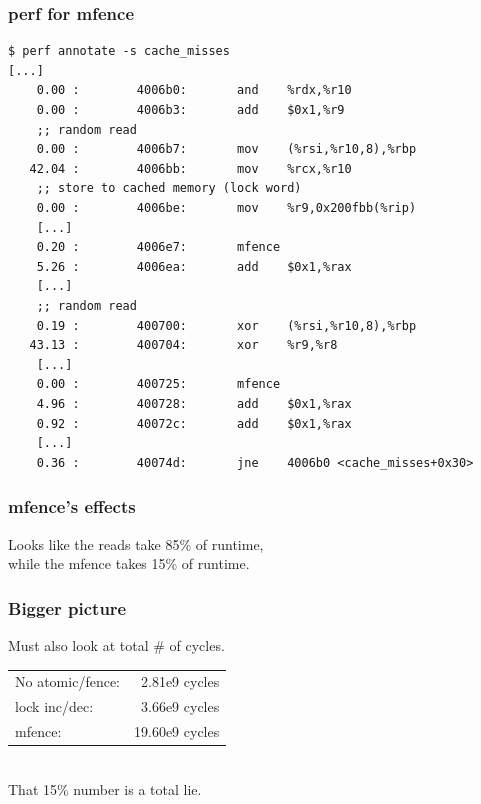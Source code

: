 \documentclass[aspectratio=43]{beamer}
\newenvironment{changemargin}[1]{%
  \begin{list}{}{%
    \setlength{\topsep}{0pt}%
    \setlength{\leftmargin}{#1}%
    \setlength{\rightmargin}{1em}
    \setlength{\listparindent}{\parindent}%
    \setlength{\itemindent}{\parindent}%
    \setlength{\parsep}{\parskip}%
  }%
  \item[]}{\end{list}}
\begin{document}
\begin{frame}[fragile]
  \frametitle{perf for mfence}

  \begin{lstlisting}
$ perf annotate -s cache_misses
[...]
    0.00 :        4006b0:       and    %rdx,%r10
    0.00 :        4006b3:       add    $0x1,%r9
    ;; random read
    0.00 :        4006b7:       mov    (%rsi,%r10,8),%rbp
   42.04 :        4006bb:       mov    %rcx,%r10
    ;; store to cached memory (lock word)
    0.00 :        4006be:       mov    %r9,0x200fbb(%rip)
    [...]
    0.20 :        4006e7:       mfence 
    5.26 :        4006ea:       add    $0x1,%rax
    [...]
    ;; random read
    0.19 :        400700:       xor    (%rsi,%r10,8),%rbp
   43.13 :        400704:       xor    %r9,%r8
    [...]
    0.00 :        400725:       mfence 
    4.96 :        400728:       add    $0x1,%rax
    0.92 :        40072c:       add    $0x1,%rax
    [...]
    0.36 :        40074d:       jne    4006b0 <cache_misses+0x30>
  \end{lstlisting}

\end{frame}

\begin{frame}
  \frametitle{mfence's effects}

  \begin{changemargin}{2cm}
    Looks like the reads take 85\% of runtime,\\
    while the mfence takes 15\% of runtime.
  \end{changemargin}

\end{frame}

\begin{frame}
  \frametitle{Bigger picture}

  \begin{changemargin}{2cm}
    Must also look at total \# of cycles.\\[1em]
    \begin{tabular}{lr}
    No atomic/fence:& 2.81e9 cycles\\
    lock inc/dec: & 3.66e9 cycles\\
    mfence: & 19.60e9 cycles
    \end{tabular}
~\\[1em]
    That 15\% number is a total lie.
  \end{changemargin}

\end{frame}
\end{document}

